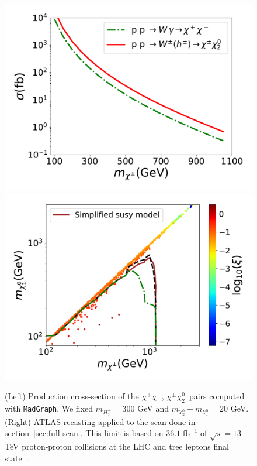 \documentclass[12pt,letterpaper]{article}
\begin{document}
%
\begin{figure}[h]
\begin{center}
\includegraphics[scale=0.43]{sigma_pp_xx_MadGraph}
\includegraphics[scale=0.42]{compressed_spectra}
\caption{ (Left) Production cross-section of the $\chi^+\chi^-$, $\chi^{\pm}\chi_2^0\,$ pairs computed with \texttt{MadGraph}\cite{Alwall:2014hca}. We fixed $m_{H_2^{\pm}}=300$ GeV and $m_{\chi_2^0}-m_{\chi_1^0}=20$ GeV. 
(Right) ATLAS recasting applied to the scan done in section~\ref{sec:full-scan}. This limit is based on $36.1\; \text{fb}^{-1}$ of $\sqrt{s} = 13$ TeV proton-proton collisions at the LHC and tree leptons final state~\cite{Aaboud:2018jiw}. }
\label{fig:LHC}
\end{center}
\end{figure}
\end{document}
